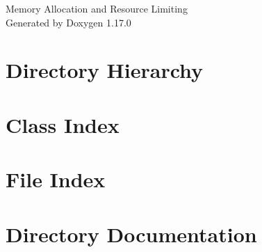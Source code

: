 \documentclass[twoside]{book}
\newcommand{\+}{\discretionary{\mbox{\scriptsize$\hookleftarrow$}}{}{}}
\newcommand{\clearemptydoublepage}{%
    \newpage{\pagestyle{empty}\cleardoublepage}%
  }
\begin{document}
  \raggedbottom
    \hypersetup{pageanchor=false,
                bookmarksnumbered=true,
                pdfencoding=unicode
               }
  \begin{titlepage}
  \vspace*{7cm}
  \begin{center}%
  {\Large Memory Allocation and Resource Limiting}\\
  \vspace*{1cm}
  {\large Generated by Doxygen 1.17.0}\\
  \end{center}
  \end{titlepage}
  \clearemptydoublepage
  \tableofcontents
  \clearemptydoublepage
  \hypersetup{pageanchor=true}







\chapter{Directory Hierarchy}

\chapter{Class Index}

\chapter{File Index}

\chapter{Directory Documentation}











\end{document}
